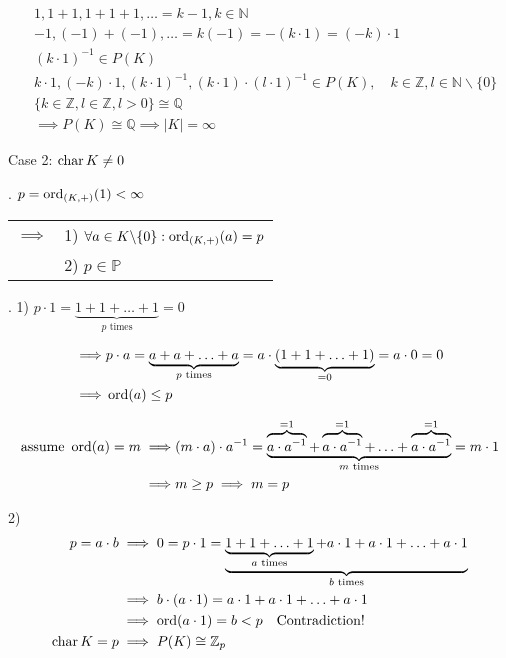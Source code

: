 \begin{align*}
&1, 1+1, 1+1+1, \ldots = k-1, k \in \mathbb{N}\\
&-1, (-1)+(-1), \ldots = k(-1) = -(k\cdot 1) = (-k) \cdot 1\\
&(k\cdot 1)^{-1} \in P(K)\\
&k\cdot 1, (-k)\cdot 1,(k\cdot 1)^{-1}, (k\cdot 1)\cdot (l\cdot 1)^{-1} \in P(K), \quad k \in \mathbb{Z}, l \in \mathbb{N} \backslash \{0\}\\
&\{ k \in \mathbb{Z}, l \in \mathbb{Z}, l>0 \} \cong \mathbb{Q}\\
&\implies P(K) \cong \mathbb{Q} \implies |K|=\infty
\end{align*}

Case 2: $\operatorname{char} K \neq 0$

\Lemma.
$p = \operatorname{ord}_{(K,+)} (1) < \infty$
\begin{tabular}{ll}
$\implies$
  & 1) $\forall a \in K \backslash \{0\}: \operatorname{ord}_{(K,+)} (a) = p$\\
  & 2) $p \in \mathbb{P}$
\end{tabular}

\Proof.
1) $p\cdot 1 = \underbrace{1+1+ \ldots +1}_{p \text{ times}} = 0$

\begin{align*}
  \implies & p \cdot a = \underbrace{a+a+ \ldots +a}_{p\text{ times}} = a \cdot \underbrace{(1+1+ \ldots +1)}_{=0} = a\cdot 0 = 0 \\
  \implies & \operatorname{ord}(a) \leq p
\end{align*}

\begin{align*}
  \text{assume }\operatorname{ord}(a) = m \implies
  & (m\cdot a)\cdot a^{-1} =
    \underbrace{\overbrace{a\cdot a^{-1}}^{=1} + \overbrace{a\cdot a^{-1}}^{=1} + \ldots + \overbrace{a\cdot a^{-1}}^{=1}}_{m\text{ times}} = m\cdot 1 \\
  \implies & m \geq p \implies m = p
\end{align*}

2)
\begin{align*}
p=a\cdot b & \implies 0=p \cdot 1 = \underbrace{\underbrace{1 + 1 + \ldots + 1}_{a\text{ times}} + a\cdot 1 + a\cdot 1 + \ldots + a\cdot 1}_{b\text{ times}}\\
&\implies b \cdot (a \cdot 1) = a\cdot 1 + a\cdot 1 + \ldots + a\cdot 1\\
&\implies \operatorname{ord}(a\cdot 1)=b < p \quad \text{Contradiction!}\\
\operatorname{char} K=p &\implies P(K) \cong \mathbb{Z}_p
\end{align*}
